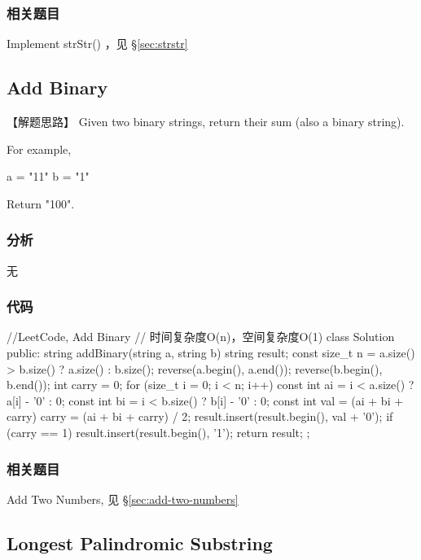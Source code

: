 \subsubsection{相关题目}
\begindot
\item Implement strStr() ，见 \S \ref{sec:strstr}
\myenddot


\subsection{Add Binary} %
\label{sec:add-binary}


【解题思路】
Given two binary strings, return their sum (also a binary string).

For example,
\begin{Code}
	a = "11"
	b = "1"
\end{Code}
Return {\small {} "100"}.


\subsubsection{分析}
无


\subsubsection{代码}
\begin{Code}
	//LeetCode, Add Binary
	// 时间复杂度O(n)，空间复杂度O(1)
	class Solution {
		public:
		string addBinary(string a, string b) {
			string result;
			const size_t n = a.size() > b.size() ? a.size() : b.size();
			reverse(a.begin(), a.end());
			reverse(b.begin(), b.end());
			int carry = 0;
			for (size_t i = 0; i < n; i++) {
				const int ai = i < a.size() ? a[i] - '0' : 0;
				const int bi = i < b.size() ? b[i] - '0' : 0;
				const int val = (ai + bi + carry) %
				carry = (ai + bi + carry) / 2;
				result.insert(result.begin(), val + '0');
			}
			if (carry == 1) {
				result.insert(result.begin(), '1');
			}
			return result;
		}
	};
\end{Code}


\subsubsection{相关题目}
\begindot
\item Add Two Numbers, 见 \S \ref{sec:add-two-numbers}
\myenddot


\subsection{Longest Palindromic Substring} %
\label{sec:longest-palindromic-substring}


